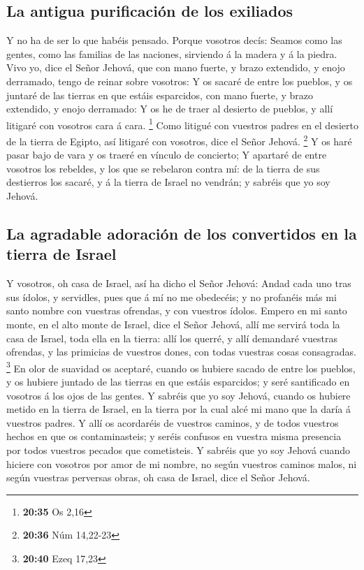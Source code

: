 \hypertarget{la-antigua-purificaciuxf3n-de-los-exiliados}{%
\subsection{La antigua purificación de los
exiliados}\label{la-antigua-purificaciuxf3n-de-los-exiliados}}

 Y no ha de ser lo que habéis pensado. Porque vosotros
decís: Seamos como las gentes, como las familias de las naciones,
sirviendo á la madera y á la piedra.  Vivo yo, dice el
Señor Jehová, que con mano fuerte, y brazo extendido, y enojo derramado,
tengo de reinar sobre vosotros:  Y os sacaré de entre los
pueblos, y os juntaré de las tierras en que estáis esparcidos, con mano
fuerte, y brazo extendido, y enojo derramado:  Y os he de
traer al desierto de pueblos, y allí litigaré con vosotros cara á cara.
\footnote{\textbf{20:35} Os 2,16}  Como litigué con
vuestros padres en el desierto de la tierra de Egipto, así litigaré con
vosotros, dice el Señor Jehová. \footnote{\textbf{20:36} Núm 14,22-23}
 Y os haré pasar bajo de vara y os traeré en vínculo de
concierto;  Y apartaré de entre vosotros los rebeldes, y
los que se rebelaron contra mí: de la tierra de sus destierros los
sacaré, y á la tierra de Israel no vendrán; y sabréis que yo soy Jehová.

\hypertarget{la-agradable-adoraciuxf3n-de-los-convertidos-en-la-tierra-de-israel}{%
\subsection{La agradable adoración de los convertidos en la tierra de
Israel}\label{la-agradable-adoraciuxf3n-de-los-convertidos-en-la-tierra-de-israel}}

 Y vosotros, oh casa de Israel, así ha dicho el Señor
Jehová: Andad cada uno tras sus ídolos, y servidles, pues que á mí no me
obedecéis; y no profanéis más mi santo nombre con vuestras ofrendas, y
con vuestros ídolos.  Empero en mi santo monte, en el alto
monte de Israel, dice el Señor Jehová, allí me servirá toda la casa de
Israel, toda ella en la tierra: allí los querré, y allí demandaré
vuestras ofrendas, y las primicias de vuestros dones, con todas vuestras
cosas consagradas. \footnote{\textbf{20:40} Ezeq 17,23}  En
olor de suavidad os aceptaré, cuando os hubiere sacado de entre los
pueblos, y os hubiere juntado de las tierras en que estáis esparcidos; y
seré santificado en vosotros á los ojos de las gentes.  Y
sabréis que yo soy Jehová, cuando os hubiere metido en la tierra de
Israel, en la tierra por la cual alcé mi mano que la daría á vuestros
padres.  Y allí os acordaréis de vuestros caminos, y de
todos vuestros hechos en que os contaminasteis; y seréis confusos en
vuestra misma presencia por todos vuestros pecados que cometisteis.
 Y sabréis que yo soy Jehová cuando hiciere con vosotros
por amor de mi nombre, no según vuestros caminos malos, ni según
vuestras perversas obras, oh casa de Israel, dice el Señor Jehová.

